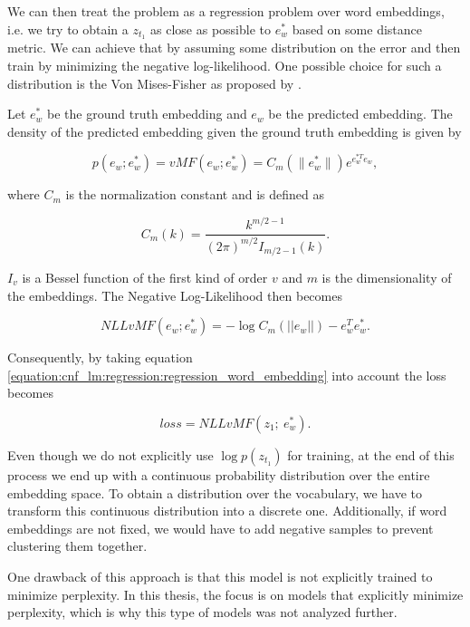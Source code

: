 We can then treat the problem as a regression problem over word embeddings, i.e. we try to obtain a $ z_{t_1} $ as close as possible to $ e_w^* $ based on some distance metric. We can achieve that by assuming some distribution on the error and then train by minimizing the negative log-likelihood. One possible choice for such a distribution is the Von Mises-Fisher as proposed by \citet{kumar2018mises}.

Let $ e_w^* $ be the ground truth embedding and $ e_w $ be the predicted embedding. The density of the predicted embedding given the ground truth embedding is given by

\begin{displaymath}
    p(e_w; e_w^*) = vMF(e_w; e_w^*) = C_m(\| e_w^* \|) e^{e_w^{*T} e_w},
\end{displaymath}

where $ C_m $ is the normalization constant and is defined as

\begin{displaymath}
    C_m(k) = \frac{ k^{m/2 - 1} } { (2\pi)^{m/2} I_{m/2 - 1}(k) }.
\end{displaymath}

$ I_v $ is a Bessel function of the first kind of order $ v $ and $ m $ is the dimensionality of the embeddings. The Negative Log-Likelihood then becomes

\begin{displaymath}
    NLLvMF(e_w; e_w^*) = - \log C_m(|| e_w ||) - e_w^T e_w^*.
\end{displaymath}

Consequently, by taking equation \ref{equation:cnf_lm:regression:regression_word_embedding} into account the loss becomes

\begin{displaymath}
    loss =  NLLvMF(z_1; \ e_w^*).
\end{displaymath}

Even though we do not explicitly use $ \log p(z_{t_1}) $ for training, at the end of this process we end up with a continuous probability distribution over the entire embedding space. To obtain a distribution over the vocabulary, we have to transform this continuous distribution into a discrete one. Additionally, if word embeddings are not fixed, we would have to add negative samples to prevent clustering them together. 

One drawback of this approach is that this model is not explicitly trained to minimize perplexity. In this thesis, the focus is on models that explicitly minimize perplexity, which is why this type of models was not analyzed further.


